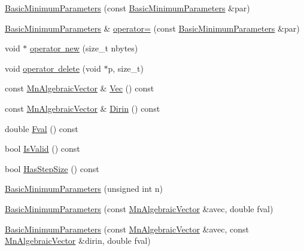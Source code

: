 \begin{DoxyCompactItemize}
\mbox{\hyperlink{classROOT_1_1Minuit2_1_1BasicMinimumParameters_a8714fc623b46e7f891748583ff7746b9}{Basic\+Minimum\+Parameters}} (const \mbox{\hyperlink{classROOT_1_1Minuit2_1_1BasicMinimumParameters}{Basic\+Minimum\+Parameters}} \&par)
\item 
\mbox{\hyperlink{classROOT_1_1Minuit2_1_1BasicMinimumParameters}{Basic\+Minimum\+Parameters}} \& \mbox{\hyperlink{classROOT_1_1Minuit2_1_1BasicMinimumParameters_a468d3eefd1f7080b499f090afdb3eab4}{operator=}} (const \mbox{\hyperlink{classROOT_1_1Minuit2_1_1BasicMinimumParameters}{Basic\+Minimum\+Parameters}} \&par)
\item 
void $\ast$ \mbox{\hyperlink{classROOT_1_1Minuit2_1_1BasicMinimumParameters_a5258a9959c0b6ff699a9200dad4caee0}{operator new}} (size\+\_\+t nbytes)
\item 
void \mbox{\hyperlink{classROOT_1_1Minuit2_1_1BasicMinimumParameters_aaaef6d3167e6f4a88182d6f171641fb9}{operator delete}} (void $\ast$p, size\+\_\+t)
\item 
const \mbox{\hyperlink{namespaceROOT_1_1Minuit2_a62ed97730a1ca8d3fbaec64a19aa11c9}{Mn\+Algebraic\+Vector}} \& \mbox{\hyperlink{classROOT_1_1Minuit2_1_1BasicMinimumParameters_ae8dc429aa9491e545efd916d4f72f8dd}{Vec}} () const
\item 
const \mbox{\hyperlink{namespaceROOT_1_1Minuit2_a62ed97730a1ca8d3fbaec64a19aa11c9}{Mn\+Algebraic\+Vector}} \& \mbox{\hyperlink{classROOT_1_1Minuit2_1_1BasicMinimumParameters_a4a4abef44e633bce699eb280228702e1}{Dirin}} () const
\item 
double \mbox{\hyperlink{classROOT_1_1Minuit2_1_1BasicMinimumParameters_a5d92e23ec6117dd29e3e7e2b62ebaf16}{Fval}} () const
\item 
bool \mbox{\hyperlink{classROOT_1_1Minuit2_1_1BasicMinimumParameters_a095b6bfb0949e1d64ef40a94c5d605d6}{Is\+Valid}} () const
\item 
bool \mbox{\hyperlink{classROOT_1_1Minuit2_1_1BasicMinimumParameters_a482374735681f4f24417e7cd1af044df}{Has\+Step\+Size}} () const
\item 
\mbox{\hyperlink{classROOT_1_1Minuit2_1_1BasicMinimumParameters_ac3a8db51a43b7f99f9e71dcfb9ca9009}{Basic\+Minimum\+Parameters}} (unsigned int n)
\item 
\mbox{\hyperlink{classROOT_1_1Minuit2_1_1BasicMinimumParameters_aebd12d902d3b0badb28a804ccfb4ed8a}{Basic\+Minimum\+Parameters}} (const \mbox{\hyperlink{namespaceROOT_1_1Minuit2_a62ed97730a1ca8d3fbaec64a19aa11c9}{Mn\+Algebraic\+Vector}} \&avec, double fval)
\item 
\mbox{\hyperlink{classROOT_1_1Minuit2_1_1BasicMinimumParameters_a37ff3c6b2ad9075c4c3e347af3febcbe}{Basic\+Minimum\+Parameters}} (const \mbox{\hyperlink{namespaceROOT_1_1Minuit2_a62ed97730a1ca8d3fbaec64a19aa11c9}{Mn\+Algebraic\+Vector}} \&avec, const \mbox{\hyperlink{namespaceROOT_1_1Minuit2_a62ed97730a1ca8d3fbaec64a19aa11c9}{Mn\+Algebraic\+Vector}} \&dirin, double fval)

\end{DoxyCompactItemize}
